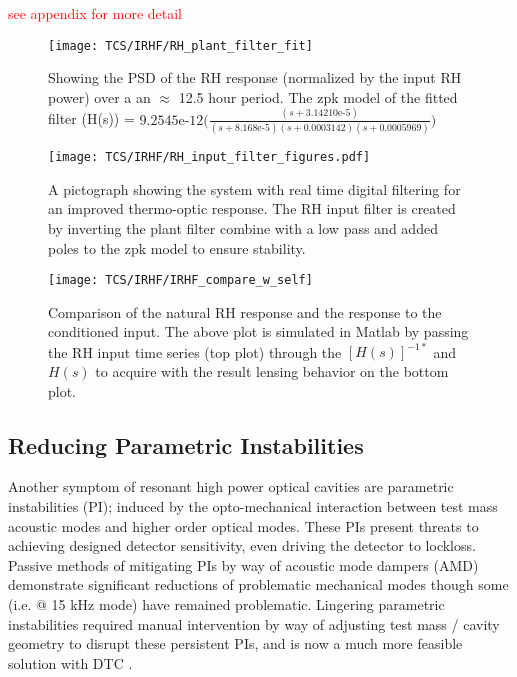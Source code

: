 \textcolor{red}{see appendix for more detail}

\begin{figure}[H]
    \texttt{[image: TCS/IRHF/RH\_plant\_filter\_fit]}
    \caption{Showing the PSD of the RH response (normalized by the input RH power) over a an $\approx$ 12.5 hour period. The zpk model of the fitted filter (H(s)) = $9.2545\mathrm{e} \text{-}12 \Big(\frac{(s+3.14210\mathrm{e}\text{-}5)}{(s+8.168\mathrm{e}\text{-}5)(s+0.0003142)(s+0.0005969)}\Big)$}
    \label{fig:plant_v_fit}
\end{figure}

\begin{figure}[H]
    \centering
    \texttt{[image: TCS/IRHF/RH\_input\_filter\_figures.pdf]}
    \caption{A pictograph showing the system with real time digital filtering for an improved thermo-optic response. The RH input filter is created by inverting the plant filter combine with a low pass and added poles to the zpk model to ensure stability.}
    \label{fig:rtdf_pictograph}
\end{figure}

\begin{figure}[H]
    \texttt{[image: TCS/IRHF/IRHF\_compare\_w\_self]}
    \caption{Comparison of the natural RH response and the response to the conditioned input. The above plot is simulated in Matlab by passing the RH input time series (top plot) through the $[H(s)]^{-1*}$ and $H(s)$ to acquire with the result lensing behavior on the bottom plot.}
    \label{fig:dynam_comparison}
\end{figure}
\newpage

\subsection{Reducing Parametric Instabilities}
Another symptom of resonant high power optical cavities are parametric instabilities (PI); induced by the opto-mechanical interaction between test mass acoustic modes and higher order optical modes. These PIs present threats to achieving designed detector sensitivity, even driving the detector to lockloss. Passive methods of mitigating PIs by way of acoustic mode dampers (AMD) demonstrate significant reductions of problematic mechanical modes though some (i.e. @ 15 kHz mode) have remained problematic. Lingering parametric instabilities required manual intervention by way of adjusting test mass / cavity geometry to disrupt these persistent PIs, and is now a much more feasible solution with DTC \cite{hardwick:2020}.  

